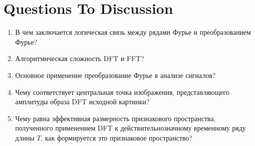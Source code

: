 \section{Questions To Discussion}

\begin{enumerate}
\item В чем заключается логическая связь между рядами Фурье и преобразованием Фурье? 
\item Алгоритмическая сложность DFT и FFT?
\item Основное применение преобразование Фурье в анализе сигналов?
\item Чему соответствует центральная точка изображения, представляющего амплитуды образа DFT исходной картинки? 
\item Чему равна эффективная размерность признакового пространства, полученного применением DFT к действительнозначному временному ряду длины $T$, как формируется это признаковое пространство?
\end{enumerate}